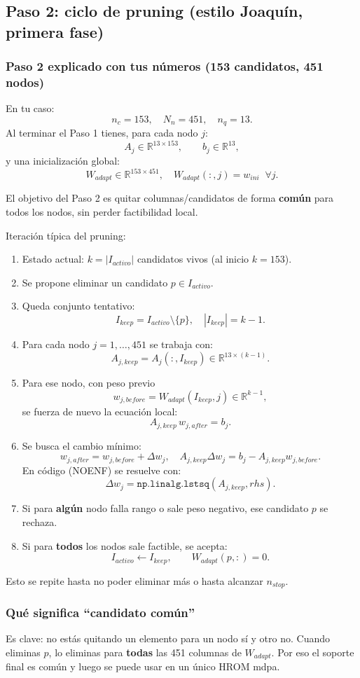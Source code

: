 \documentclass[11pt,a4paper]{article}
\begin{document}
\subsection{Paso 2: ciclo de pruning (estilo Joaquín, primera fase)}
\subsubsection*{Paso 2 explicado con tus números (153 candidatos, 451 nodos)}
En tu caso:
\[
n_c=153,\quad N_n=451,\quad n_q=13.
\]
Al terminar el Paso 1 tienes, para cada nodo $j$:
\[
A_j\in\mathbb{R}^{13\times 153},\qquad b_j\in\mathbb{R}^{13},
\]
y una inicialización global:
\[
W_{adapt}\in\mathbb{R}^{153\times451},
\quad
W_{adapt}(:,j)=w_{ini}\;\;\forall j.
\]

El objetivo del Paso 2 es quitar columnas/candidatos de forma \textbf{común} para todos
los nodos, sin perder factibilidad local.

Iteración típica del pruning:
\begin{enumerate}[leftmargin=1.5em]
\item Estado actual: $k=|I_{activo}|$ candidatos vivos (al inicio $k=153$).
\item Se propone eliminar un candidato $p\in I_{activo}$.
\item Queda conjunto tentativo:
\[
I_{keep}=I_{activo}\setminus\{p\},
\quad |I_{keep}|=k-1.
\]
\item Para cada nodo $j=1,\dots,451$ se trabaja con:
\[
A_{j,keep}=A_j(:,I_{keep})\in\mathbb{R}^{13\times(k-1)}.
\]
\item Para ese nodo, con peso previo
\[
w_{j,before}=W_{adapt}(I_{keep},j)\in\mathbb{R}^{k-1},
\]
se fuerza de nuevo la ecuación local:
\[
A_{j,keep}\,w_{j,after}=b_j.
\]
\item Se busca el cambio mínimo:
\[
w_{j,after}=w_{j,before}+\Delta w_j,\quad
A_{j,keep}\Delta w_j=b_j-A_{j,keep}w_{j,before}.
\]
En código (NOENF) se resuelve con:
\[
\Delta w_j=\texttt{np.linalg.lstsq}(A_{j,keep},rhs).
\]
\item Si para \textbf{algún} nodo falla rango o sale peso negativo, ese candidato $p$
se rechaza.
\item Si para \textbf{todos} los nodos sale factible, se acepta:
\[
I_{activo}\leftarrow I_{keep},\qquad
W_{adapt}(p,:)=0.
\]
\end{enumerate}

Esto se repite hasta no poder eliminar más o hasta alcanzar $n_{stop}$.

\subsubsection*{Qué significa ``candidato común''}
Es clave: no estás quitando un elemento para un nodo sí y otro no.
Cuando eliminas $p$, lo eliminas para \textbf{todas} las 451 columnas de $W_{adapt}$.
Por eso el soporte final es común y luego se puede usar en un único HROM mdpa.
\end{document}
